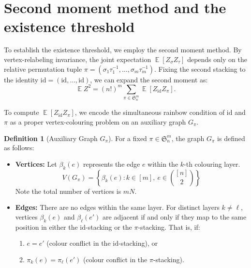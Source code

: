 \documentclass[11pt,reqno]{amsart}
\theoremstyle{definition}
\newtheorem{definition}[theorem]{Definition}
\theoremstyle{remark}
\newcommand\E{\operatorname{\mathbb{E}}}
\begin{document}
\medskip


\section{Second moment method and the existence threshold}\label{sec:second_moment}

To establish the existence threshold, we employ the second moment method. By vertex-relabeling invariance, the joint expectation $\E[Z_\sigma Z_\tau]$ depends only on the relative permutation tuple $\pi = (\sigma_1\tau_1^{-1},\ldots,\sigma_m\tau_m^{-1})$. Fixing the second stacking to the identity $\mathrm{id} = (\mathrm{id},\ldots,\mathrm{id})$, we can expand the second moment as:
\begin{equation}\label{eq:second_moment_reduction}
        \E Z^2=(n!)^m\sum_{\pi\in\mathfrak S_n^m} \E[Z_{\mathrm{id}}Z_\pi].
\end{equation}

To compute $\E[Z_{\mathrm{id}}Z_\pi]$, we encode the simultaneous rainbow condition of $\mathrm{id}$ and $\pi$ as a proper vertex-colouring problem on an auxiliary graph $G_\pi$.

\begin{definition}[Auxiliary Graph $G_\pi$]\label{def:aux_graph}
For a fixed $\pi\in\mathfrak S_n^m$, the graph $G_\pi$ is defined as follows:
\begin{itemize}
    \item \textbf{Vertices:} Let $\beta_k(e)$ represents the edge $e$ within the $k$-th colouring layer.
    $$V(G_\pi)=\left\{\beta_k(e): k\in[m],\ e\in\binom{[n]}2\right\}$$ 
    Note the total number of vertices is $mN$.
    
    \item \textbf{Edges:} There are no edges within the same layer. For distinct layers $k\neq \ell$, vertices $\beta_k(e)$ and $\beta_\ell(e')$ are adjacent if and only if they map to the same position in either the $\mathrm{id}$-stacking or the $\pi$-stacking. That is, if:
    \begin{enumerate}[label=\textup{(\roman*)}]
        \item $e=e'$ \quad (colour conflict in the $\mathrm{id}$-stacking), or
        \item $\pi_k(e)=\pi_\ell(e')$ \quad (colour conflict in the $\pi$-stacking).
    \end{enumerate}
\end{itemize}
\end{definition}
\end{document}
